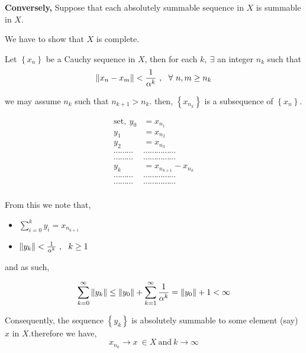 \documentclass[a4paper,12pt]{article}
\begin{document}
    {\bf Conversely,} Suppose that each absolutely summable sequence in $X$ is summable in $X$.

    We have to show that $X$ is complete.

    Let $\left\{x_n\right\}$ be a Cauchy sequence in $X$, then for each $k ,\  \exists$ an integer $n_k$ such that 
    \[\norm{x_n - x_m} < \frac{1}{\alpha^k}\ ,\ \ \forall\ n,m \geq n_k\] 
    \begin{center}
        we may assume $n_k$ such that $n_{k+1} > n_{k}$.
        then, $\left\{x_{n_k} \right\}$ is a subsequence of $\left\{x_n\right\}$.

        \pagebreak

        \begin{equation*}
            \begin{split}
                \mbox{set},\ y_0 & = x_{n_1}\\
                y_1 & = x_{n_2}\\
                y_2 & = x_{n_3}\\
                \cdots \cdots \cdots & \cdots \cdots \cdots \cdots \cdots\\
                \cdots \cdots \cdots & \cdots \cdots \cdots \cdots \cdots\\
                y_k & = x_{n_{k+1}}- x_{n_k}\\
                \cdots \cdots \cdots & \cdots \cdots \cdots \cdots \cdots\\
                \cdots \cdots \cdots & \cdots \cdots \cdots \cdots \cdots\\
            \end{split}
        \end{equation*}
    \end{center}

    From this we note that,
    \begin{itemize}
        \item $\sum_{i=0}^{k}y_i = x_{n_{k+1}}$
        \item $\norm{y_k} < \frac{1}{\alpha^k}\ ,\ \ k\geq 1$
    \end{itemize}

    and as such,

    \[\sum_{k=0}^{\infty}\norm{y_k} \leq \norm{y_0} + \sum_{k=1}^{\infty}\frac{1}{\alpha^k} = \norm{y_0} + 1 < \infty\]

    Consequently, the sequence $\left\{y_k\right\}$ is absolutely summable to some element (say) $x$ in $X$.therefore we have,
    \[x_{n_k}\to x\ \in X\ \mbox{and}\ k\to \infty\]
\end{document}
